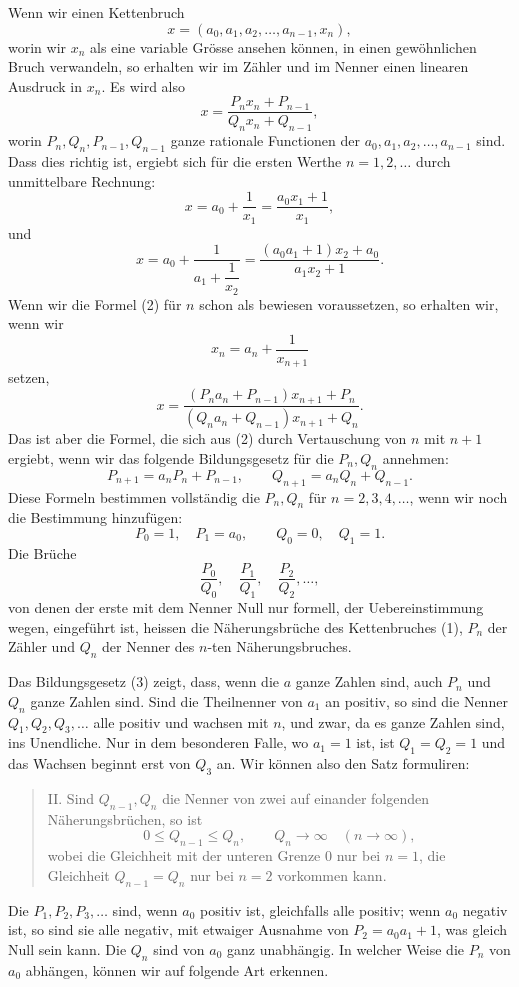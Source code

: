 \documentclass[11pt]{article}
\begin{document}
Wenn wir einen Kettenbruch
\[
\tag{1}        x=(a_0,a_1,a_2,\ldots,a_{n-1},x_n),
\]
worin wir $x_n$ als eine variable Grösse ansehen können, in einen gewöhnlichen Bruch verwandeln, so erhalten wir im Zähler und im Nenner einen linearen Ausdruck in $x_n$. Es wird also
\[
\tag{2}        x=\frac{P_nx_n+P_{n-1}}{Q_nx_n+Q_{n-1}},
\]
worin $P_n,Q_n,P_{n-1},Q_{n-1}$ ganze rationale Functionen der $a_0,a_1,a_2,\ldots,a_{n-1}$ sind. Dass dies richtig ist, ergiebt sich für die ersten Werthe $n=1,2,\ldots$ durch unmittelbare Rechnung:
\[
 x=a_0+\frac1{x_1}=\frac{a_0x_1+1}{x_1},
\]
und
\[
 x=a_0+\frac1{a_1+\dfrac1{x_2}}
  =\frac{(a_0a_1+1)x_2+a_0}{a_1x_2+1}.
\]
Wenn wir die Formel (2) für $n$ schon als bewiesen voraussetzen, so erhalten wir, wenn wir
\[
        x_n=a_n+\frac1{x_{n+1}}
\]
setzen,
\[
 x=\frac{(P_na_n+P_{n-1})x_{n+1}+P_n}
        {(Q_na_n+Q_{n-1})x_{n+1}+Q_n}.
\]
Das ist aber die Formel, die sich aus (2) durch Vertauschung von $n$ mit $n+1$ ergiebt, wenn wir das folgende Bildungsgesetz für die $P_n,Q_n$ annehmen:
\[
\tag{3}        P_{n+1}=a_nP_n+P_{n-1},\qquad
               Q_{n+1}=a_nQ_n+Q_{n-1}.
\]
Diese Formeln bestimmen vollständig die $P_n,Q_n$ für $n=2,3,4,\ldots$, wenn wir noch die Bestimmung hinzufügen:
\[
\tag{4}        P_0=1,\quad P_1=a_0,\qquad
               Q_0=0,\quad Q_1=1.
\]
Die Brüche
\[
        \frac{P_0}{Q_0},\quad \frac{P_1}{Q_1},\quad \frac{P_2}{Q_2},\ldots,
\]
von denen der erste mit dem Nenner Null nur formell, der Uebereinstimmung wegen, eingeführt ist, heissen die Näherungsbrüche des Kettenbruches (1), $P_n$ der Zähler und $Q_n$ der Nenner des $n$-ten Näherungsbruches.

Das Bildungsgesetz (3) zeigt, dass, wenn die $a$ ganze Zahlen sind, auch $P_n$ und $Q_n$ ganze Zahlen sind. Sind die Theilnenner von $a_1$ an positiv, so sind die Nenner $Q_1,Q_2,Q_3,\ldots$ alle positiv und wachsen mit $n$, und zwar, da es ganze Zahlen sind, ins Unendliche. Nur in dem besonderen Falle, wo $a_1=1$ ist, ist $Q_1=Q_2=1$ und das Wachsen beginnt erst von $Q_3$ an. Wir können also den Satz formuliren:

\begin{quote}
II. Sind $Q_{n-1},Q_n$ die Nenner von zwei auf einander folgenden Näherungsbrüchen, so ist
\[
        0\le Q_{n-1}\le Q_n,\qquad Q_n\to\infty\quad(n\to\infty),
\]
wobei die Gleichheit mit der unteren Grenze $0$ nur bei $n=1$, die Gleichheit $Q_{n-1}=Q_n$ nur bei $n=2$ vorkommen kann.
\end{quote}

Die $P_1,P_2,P_3,\ldots$ sind, wenn $a_0$ positiv ist, gleichfalls alle positiv; wenn $a_0$ negativ ist, so sind sie alle negativ, mit etwaiger Ausnahme von $P_2=a_0a_1+1$, was gleich Null sein kann. Die $Q_n$ sind von $a_0$ ganz unabhängig. In welcher Weise die $P_n$ von $a_0$ abhängen, können wir auf folgende Art erkennen.
\end{document}
